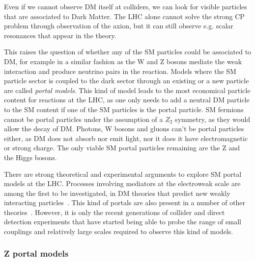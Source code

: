 Even if we cannot observe DM itself at colliders, we can look for visible particles that are associated to Dark Matter. The LHC alone cannot solve the strong CP problem through observation of the axion, but it can still observe e.g. scalar resonances that appear in the theory. 

This raises the question of whether any of the SM particles could be associated to DM, for example in a similar fashion as the W and Z bosons mediate the weak interaction and produce neutrino pairs in the reaction. Models where the SM particle sector is coupled to the dark sector through an existing or a new particle are called \textit{portal models}. This kind of model leads to the most economical particle content for reactions at the LHC, as one only needs to add a neutral DM particle to the SM content if one of the SM particles is the portal particle. SM fermions cannot be portal particles under the assumption of a $Z_2$ symmetry, as they would allow the decay of DM. Photons, W bosons and gluons can't be portal particles either, as DM does not absorb nor emit light, nor it does it have electromagnetic or strong charge. The only viable SM portal particles remaining are the Z and the Higgs bosons. 

There are strong theoretical and experimental arguments to explore SM portal models at the LHC. 
Processes involving mediators at the electroweak scale are among the first to be investigated, in DM theories that predict new weakly interacting particles~\cite{Cotta:2012nj}. This kind of portals are also present in a number of other theories~\cite{Arcadi:2014lta}. %
However, it is only the recent generations of collider and direct detection experiments that have started being able to probe the range of small couplings and relatively large scales required to observe this kind of models. 

\subsubsection{Z portal models}

